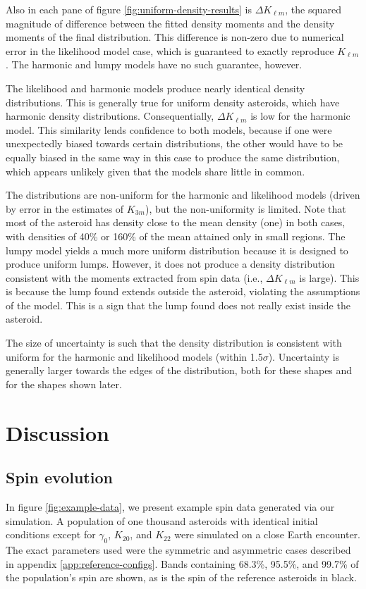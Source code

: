 \documentclass[fleqn,usenatbib]{mnras}
\begin{document}
Also in each pane of figure \ref{fig:uniform-density-results} is $\Delta K_{\ell m}$, the squared magnitude of difference between the fitted density moments and the density moments of the final distribution. This difference is non-zero due to numerical error in the likelihood model case, which is guaranteed to exactly reproduce $K_{\ell m}$. The harmonic and lumpy models have no such guarantee, however.

The likelihood and harmonic models produce nearly identical density distributions. This is generally true for uniform density asteroids, which have harmonic density distributions. Consequentially, $\Delta K_{\ell m}$ is low for the harmonic model. This similarity lends confidence to both models, because if one were unexpectedly biased towards certain distributions, the other would have to be equally biased in the same way in this case to produce the same distribution, which appears unlikely given that the models share little in common.

The distributions are non-uniform for the harmonic and likelihood models (driven by error in the estimates of $K_{3m}$), but the non-uniformity is limited. Note that most of the asteroid has density close to the mean density (one) in both cases, with densities of 40\% or 160\% of the mean attained only in small regions. The lumpy model yields a much more uniform distribution because it is designed to produce uniform lumps. However, it does not produce a density distribution consistent with the moments extracted from spin data (i.e., $\Delta K_{\ell m}$ is large). This is because the lump found extends outside the asteroid, violating the assumptions of the model. This is a sign that the lump found does not really exist inside the asteroid.

The size of uncertainty is such that the density distribution is consistent with uniform for the harmonic and likelihood models (within 1.5$\sigma$). Uncertainty is generally larger towards the edges of the distribution, both for these shapes and for the shapes shown later.






\section{Discussion}
\label{sec:discussion}

\subsection{Spin evolution}
\label{sec:spin-evolution}
In figure \ref{fig:example-data}, we present example spin data generated via our simulation. A population of one thousand asteroids with identical initial conditions except for $\gamma_0$, $K_{20}$, and $K_{22}$ were simulated on a close Earth encounter. The exact parameters used were the symmetric and asymmetric cases described in appendix \ref{app:reference-configs}. Bands containing 68.3\%, 95.5\%, and 99.7\% of the population's spin are shown, as is the spin of the reference asteroids in black.
\end{document}
